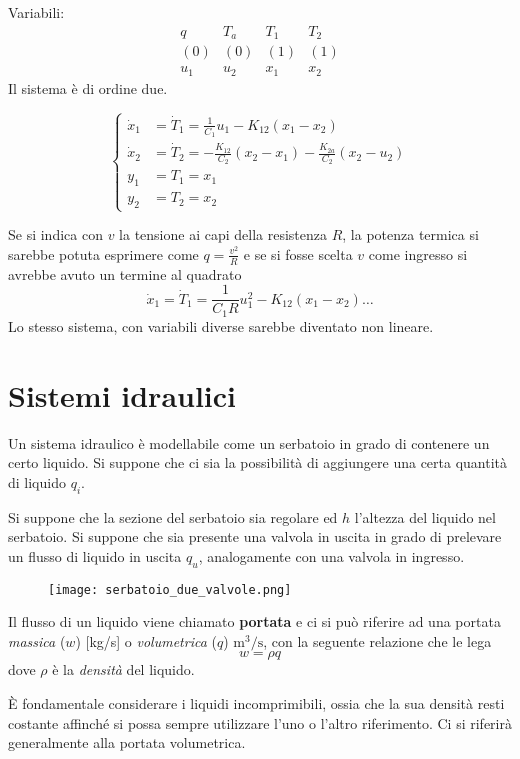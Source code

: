 Variabili:
$$\begin{matrix}
q & T_a & T_1 & T_2 \\
(0) & (0) & (1) & (1) \\
u_1 & u_2 & x_1 & x_2
\end{matrix}$$
Il sistema è di ordine due.

$$\left\{\begin{aligned}
\dot x_1 &= \dot{T}_1 = \frac{1}{C_1}u_1 - K_{12}(x_1-x_2)\\
\dot x_2 &= \dot T_2 = -\frac{K_{12}}{C_2} (x_2-x_1) -
\frac{K_{2a}}{C_2}(x_2-u_2)\\
y_1 &= T_1 = x_1 \\
y_2 &= T_2 = x_2
\end{aligned}\right.$$

Se si indica con $v$ la tensione ai capi della resistenza $R$, la potenza
termica si sarebbe potuta esprimere come $q=\frac{v^2}{R}$ e se si fosse scelta
$v$ come ingresso si avrebbe avuto un termine al quadrato
$$
\dot x_1 = \dot T_1 = \frac{1}{C_1 R} u_1^2 - K_{12}(x_1-x_2) \dots
$$
Lo stesso sistema, con variabili diverse sarebbe diventato non lineare.

\section{Sistemi idraulici}
Un sistema idraulico è modellabile come un serbatoio in grado di contenere un
certo liquido. Si suppone che ci sia la possibilità di aggiungere una certa
quantità di liquido $q_i$.

Si suppone che la sezione del serbatoio sia regolare ed $h$ l'altezza del
liquido nel serbatoio. Si suppone che sia presente una valvola in uscita in
grado di prelevare un flusso di liquido in uscita $q_u$, analogamente con una
valvola in ingresso.

\begin{figure}[h]
 \centering
 \texttt{[image: serbatoio\_due\_valvole.png]}
 \label{Fig.:serbatoio_due_valvole}
\end{figure}


Il flusso di un liquido viene chiamato \textbf{portata} e ci si può
riferire
ad una portata \textit{massica} ($w$) [\si{\kilogram/\second}]
 o \textit{volumetrica} ($q$) $\si{\meter^3/\second}$, con la seguente
relazione che le lega
$$
w = \rho q
$$
dove $\rho$ è la \textit{densità} del liquido.

È fondamentale considerare i liquidi incomprimibili, ossia che la sua densità
resti costante affinché si possa sempre utilizzare l'uno o l'altro riferimento.
Ci si riferirà generalmente alla portata volumetrica.

